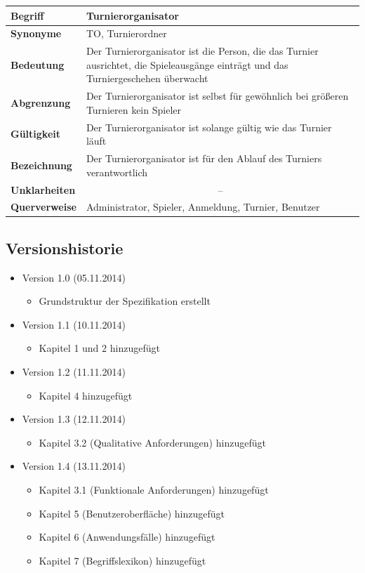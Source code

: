 \documentclass[11pt]{article}
\begin{document}
\begin{tabularx}{\textwidth}{| p{} | p{} |}
	\hline
	\textbf{Begriff} & Turnierorganisator\\ 
	\hline
	\textbf{Synonyme} & TO, Turnierordner\\
	\hline 
	\textbf{Bedeutung} & Der Turnierorganisator ist die Person, die das Turnier ausrichtet, die Spieleausgänge einträgt und das Turniergeschehen überwacht\\
	\hline
	\textbf{Abgrenzung} & Der Turnierorganisator ist selbst für gewöhnlich bei größeren Turnieren kein Spieler\\
	\hline
	\textbf{Gültigkeit} & Der Turnierorganisator ist solange gültig wie das Turnier läuft\\
	\hline
	\textbf{Bezeichnung} & Der Turnierorganisator ist für den Ablauf des Turniers verantwortlich\\
	\hline
	\textbf{Unklarheiten} & \multicolumn{1}{c|}{--} \\
	\hline
	\textbf{Querverweise} &  Administrator, Spieler, Anmeldung, Turnier, Benutzer\\
	\hline
\end{tabularx}

\newpage

\subsection{Versionshistorie}

\begin{itemize}
	\item Version 1.0 (05.11.2014)
	\begin{itemize}
		\item Grundstruktur der Spezifikation erstellt
	\end{itemize}
	\item Version 1.1 (10.11.2014)
	\begin{itemize}
		\item Kapitel 1 und 2 hinzugefügt
	\end{itemize}
	\item Version 1.2 (11.11.2014)
	\begin{itemize}	
		\item Kapitel 4 hinzugefügt
	\end{itemize}
	\item Version 1.3 (12.11.2014)
	\begin{itemize}
		\item Kapitel 3.2 (Qualitative Anforderungen) hinzugefügt
	\end{itemize}
	\item Version 1.4 (13.11.2014)
	\begin{itemize}
		\item Kapitel 3.1 (Funktionale Anforderungen) hinzugefügt
		\item Kapitel 5 (Benutzeroberfläche) hinzugefügt
		\item Kapitel 6 (Anwendungsfälle) hinzugefügt
		\item Kapitel 7 (Begriffslexikon) hinzugefügt
	\end{itemize}
\end{itemize}
\end{document}

